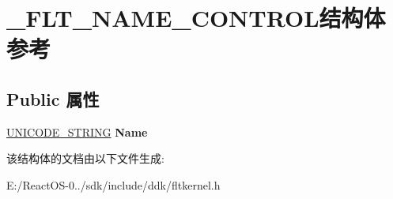 \hypertarget{struct___f_l_t___n_a_m_e___c_o_n_t_r_o_l}{}\section{\+\_\+\+F\+L\+T\+\_\+\+N\+A\+M\+E\+\_\+\+C\+O\+N\+T\+R\+O\+L结构体 参考}
\label{struct___f_l_t___n_a_m_e___c_o_n_t_r_o_l}
\subsection*{Public 属性}
\begin{DoxyCompactItemize}
\item 
\mbox{\label{struct___f_l_t___n_a_m_e___c_o_n_t_r_o_l_af7bce3d5c0bc5f9d76d91eb1671d625b}} 
\hyperlink{struct___u_n_i_c_o_d_e___s_t_r_i_n_g}{U\+N\+I\+C\+O\+D\+E\+\_\+\+S\+T\+R\+I\+NG} {\bfseries Name}
\end{DoxyCompactItemize}


该结构体的文档由以下文件生成\+:\begin{DoxyCompactItemize}
\item 
E\+:/\+React\+O\+S-\/0../sdk/include/ddk/fltkernel.\+h\end{DoxyCompactItemize}

